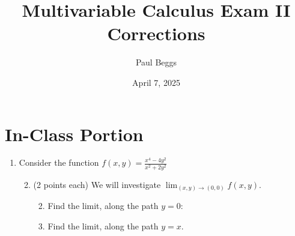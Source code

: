 \documentclass[11pt]{article}
\title{Multivariable Calculus Exam II Corrections}
\author{Paul Beggs}
\date{April 7, 2025}
\newenvironment{solution}
  {\textit{Solution.}}
\newcommand{\sol}[1]{
    \begin{customframedproof}[linecolor=orangehdx!75,]
        \begin{solution}
        #1
        \end{solution}
    \end{customframedproof}
}
\begin{document}
\maketitle

\section*{In-Class Portion}

\begin{enumerate}
  \item Consider the function \(\displaystyle f(x,y) = \frac{x^{4} - 4y^{2}}{x^{2} + 2y^{2}}\)
        \begin{enumerate}
          \setcounter{enumii}{1}
          \item (2 points each) We will investigate \(\lim_{(x,y) \rightarrow (0,0)} f(x,y)\).
                \begin{enumerate}
                  \setcounter{enumiii}{1}

                  \item Find the limit, along the path \(y = 0\):


                  \item Find the limit, along the path \(y = x\).



\end{enumerate}
\end{enumerate}
\end{enumerate}
\end{document}

